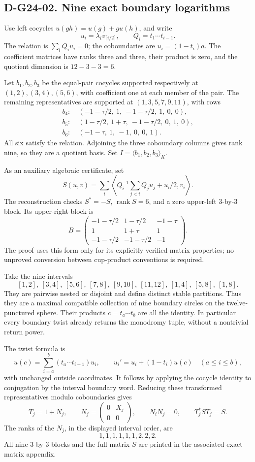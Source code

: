 \subsection*{D-G24-02. Nine exact boundary logarithms}

Use left cocycles \(u(gh)=u(g)+g u(h)\), and write
\[
 u_i=\lambda_i v_{\lceil i/2\rceil},\qquad Q_i=t_1\cdots t_{i-1}.
\]
The relation is \(\sum_i Q_i u_i=0\); the coboundaries are
\(u_i=(1-t_i)a\).  The coefficient matrices have ranks three and three,
their product is zero, and the quotient dimension is \(12-3-3=6\).

Let \(b_1,b_2,b_3\) be the equal-pair cocycles supported respectively at
\((1,2),(3,4),(5,6)\), with coefficient one at each member of the pair.
The remaining representatives are supported at \((1,3,5,7,9,11)\), with
rows
\[
\begin{aligned}
 b_4:\;&(-1-\tau/2,\ 1,\ -1-\tau/2,\ 1,\ 0,\ 0),\\
 b_5:\;&(1-\tau/2,\ 1+\tau,\ -1-\tau/2,\ 0,\ 1,\ 0),\\
 b_6:\;&(-1-\tau,\ 1,\ -1,\ 0,\ 0,\ 1).
\end{aligned}
\]
All six satisfy the relation.  Adjoining the three coboundary columns gives
rank nine, so they are a quotient basis.  Set
\(I=\langle b_1,b_2,b_3\rangle_K\).

As an auxiliary algebraic certificate, set
\[
 S(u,v)=\sum_i\left\langle Q_i^{-1}\sum_{j<i}Q_j u_j+u_i/2,v_i\right\rangle.
\]
The reconstruction checks \(S^*=-S\), \(\operatorname{rank}S=6\),
and a zero upper-left \(3\)-by-\(3\) block.  Its upper-right block is
\[
 B=\begin{pmatrix}
 -1-\tau/2&1-\tau/2&-1-\tau\\
 1&1+\tau&1\\
 -1-\tau/2&-1-\tau/2&-1
 \end{pmatrix}.
\]
The proof uses this form only for its explicitly verified matrix properties;
no unproved conversion between cup-product conventions is required.

Take the nine intervals
\[
 [1,2],\ [3,4],\ [5,6],\ [7,8],\ [9,10],\ [11,12],
 \ [1,4],\ [5,8],\ [1,8].
\]
They are pairwise nested or disjoint and define distinct stable partitions.
Thus they are a maximal compatible collection of nine boundary circles on
the twelve-punctured sphere.  Their products \(c=t_a\cdots t_b\) are all
the identity.  In particular every boundary twist already returns the
monodromy tuple, without a nontrivial return power.

The twist formula is
\[
 u(c)=\sum_{i=a}^b(t_a\cdots t_{i-1})u_i,\qquad
 u_i'=u_i+(1-t_i)u(c)\quad(a\le i\le b),
\]
with unchanged outside coordinates.  It follows by applying the cocycle
identity to conjugation by the interval boundary word.  Reducing these
transformed representatives modulo coboundaries gives
\[
 T_j=1+N_j,\qquad N_j=\begin{pmatrix}0&X_j\\0&0\end{pmatrix},
 \qquad N_iN_j=0,\qquad T_j^*ST_j=S.
\]
The ranks of the \(N_j\), in the displayed interval order, are
\[
                         1,1,1,1,1,1,2,2,2.
\]
All nine \(3\)-by-\(3\) blocks and the full matrix \(S\) are printed
in the associated exact matrix appendix.

